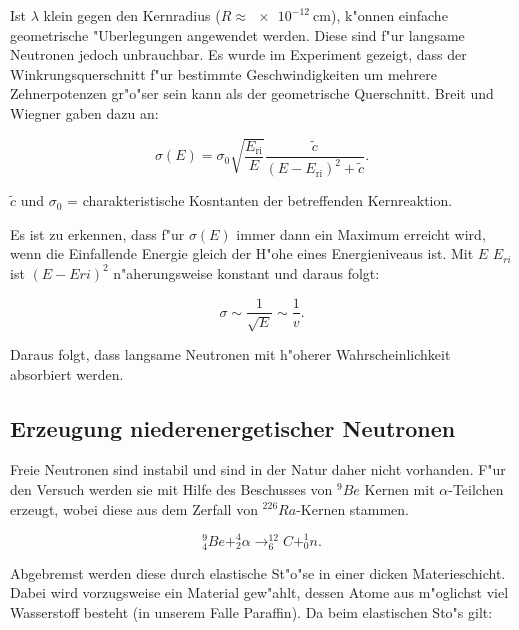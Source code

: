 			Ist $\lambda$ klein gegen den Kernradius ($R \approx \SI{e-12}{\centi\meter}$), k"onnen einfache geometrische "U\-ber\-le\-gung\-en angewendet werden.
			Diese sind f"ur langsame Neutronen jedoch unbrauchbar.
			Es wurde im Experiment gezeigt, dass der Winkrungsquerschnitt f"ur bestimmte Ge\-schwin\-dig\-kei\-ten um mehrere Zehnerpotenzen gr"o"ser sein kann als der geometrische Querschnitt.
			Breit und Wiegner gaben dazu an:

			\begin{equation*}
				\sigma(E) = \sigma_0 \sqrt{\frac{E_{\mathrm{ri}}}{E}} \frac{\tilde{c}}{(E - E_{\mathrm{ri}})^2 + \tilde{c}}.
			\end{equation*}

			\begin{center}
					\tiny{$\tilde{c}$ und $\sigma_0$ = charakteristische Kosntanten der betreffenden Kernreaktion}.
			\end{center}

			Es ist zu erkennen, dass f"ur $\sigma (E)$ immer dann ein Maximum erreicht wird, wenn die Einfallende Energie gleich der H"ohe eines Energieniveaus ist.
			Mit $E$ \ll $E_{ri}$ ist $(E - E{ri})^2$ n"aherungsweise konstant und daraus folgt:

			\begin{equation}
				\sigma \sim \frac{1}{\sqrt{E}} \sim \frac{1}{v}.
			\end{equation}

			Daraus folgt, dass langsame Neutronen mit h"oherer Wahrscheinlichkeit absorbiert werden.

	\subsection{Erzeugung niederenergetischer Neutronen}
	\label{sub:erzeugung_niederenergetischer_neutronen}

		Freie Neutronen sind instabil und sind in der Natur daher nicht vorhanden.
		F"ur den Versuch werden sie mit Hilfe des Beschusses von $^9Be$ Kernen mit $\alpha$-Teilchen erzeugt, wobei diese aus dem Zerfall von $^{226}Ra$-Kernen stammen.

		\begin{equation*}
			^9_4Be + ^4_2\alpha \rightarrow ^{12}_6C +^1_0n.
		\end{equation*}

		Abgebremst werden diese durch elastische St"o"se in einer dicken Materieschicht.
		Dabei wird vorzugsweise ein Material gew"ahlt, dessen Atome aus m"oglichst viel Wasserstoff besteht (in unserem Falle Paraffin).
		Da beim elastischen Sto"s gilt:

